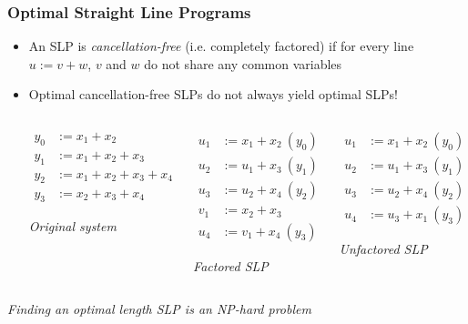 \documentclass[handout,10pt]{beamer}
\begin{document}
\begin{frame}
	\frametitle{Optimal Straight Line Programs}
	\begin{itemize}
		\item An SLP is \emph{cancellation-free} (i.e. completely factored) if for every line $u := v + w$, $v$ and $w$ do not share any common variables
		\pause 
		\item Optimal cancellation-free SLPs do not always yield optimal SLPs!
{\scriptsize

\begin{columns}[t]
\begin{column}[t]{0.305\linewidth}

\begin{align*}
y_0 & := x_1 + x_2 \\
y_1 & := x_1 + x_2 + x_3 \\
y_2 & := x_1 + x_2 + x_3 + x_4 \\
y_3 & := x_2 + x_3 + x_4 
\end{align*}

\begin{center}
\emph{Original system}
\end{center}

\end{column}

\begin{column}[t]{0.305\linewidth}

\begin{align*}
u_1 & := x_1 + x_2 \: (y_0)\\
u_2 & := u_1 + x_3 \: (y_1)\\
u_3 & := u_2 + x_4 \: (y_2)\\
v_1 & := x_2 + x_3 \\
u_4 & := v_1 + x_4 \: (y_3)
\end{align*}

\begin{center}
\emph{Factored SLP}
\end{center}

\end{column}

\begin{column}[t]{0.305\linewidth}

\begin{align*}
u_1 & := x_1 + x_2 \: (y_0)\\
u_2 & := u_1 + x_3 \: (y_1)\\
u_3 & := u_2 + x_4 \: (y_2)\\
u_4 & := u_3 + x_1 \: (y_3)
\end{align*}

\begin{center}
\emph{Unfactored SLP}
\end{center}

\end{column}

\end{columns}
}
	\end{itemize}

\pause
\begin{center}
\emph{Finding an optimal length SLP is an NP-hard problem}
\end{center}
\end{frame}
\end{document}
